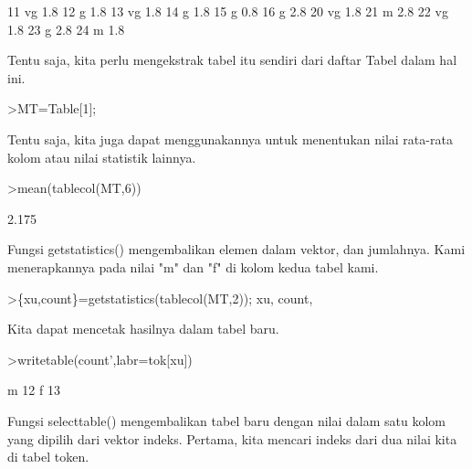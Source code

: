\documentclass[a4paper,10pt]{article}
\begin{document}
\begin{eulernotebook}
\begin{euleroutput}
          11         vg       1.8
          12          g       1.8
          13         vg       1.8
          14          g       1.8
          15          g       0.8
          16          g       2.8
          20         vg       1.8
          21          m       2.8
          22         vg       1.8
          23          g       2.8
          24          m       1.8
\end{euleroutput}
\begin{eulercomment}
Tentu saja, kita perlu mengekstrak tabel itu sendiri dari daftar Tabel
dalam hal ini.
\end{eulercomment}
\begin{eulerprompt}
>MT=Table[1];
\end{eulerprompt}
\begin{eulercomment}
Tentu saja, kita juga dapat menggunakannya untuk menentukan nilai
rata-rata kolom atau nilai statistik lainnya.
\end{eulercomment}
\begin{eulerprompt}
>mean(tablecol(MT,6))
\end{eulerprompt}
\begin{euleroutput}
  2.175
\end{euleroutput}
\begin{eulercomment}
Fungsi getstatistics() mengembalikan elemen dalam vektor, dan
jumlahnya. Kami menerapkannya pada nilai "m" dan "f" di kolom kedua
tabel kami.
\end{eulercomment}
\begin{eulerprompt}
>\{xu,count\}=getstatistics(tablecol(MT,2)); xu, count,
\end{eulerprompt}
\begin{euleroutput}
  [1,  3]
  [12,  13]
\end{euleroutput}
\begin{eulercomment}
Kita dapat mencetak hasilnya dalam tabel baru.
\end{eulercomment}
\begin{eulerprompt}
>writetable(count',labr=tok[xu])
\end{eulerprompt}
\begin{euleroutput}
           m        12
           f        13
\end{euleroutput}
\begin{eulercomment}
Fungsi selecttable() mengembalikan tabel baru dengan nilai dalam satu
kolom yang dipilih dari vektor indeks. Pertama, kita mencari indeks
dari dua nilai kita di tabel token.
\end{eulercomment}

\end{eulernotebook}
\end{document}

